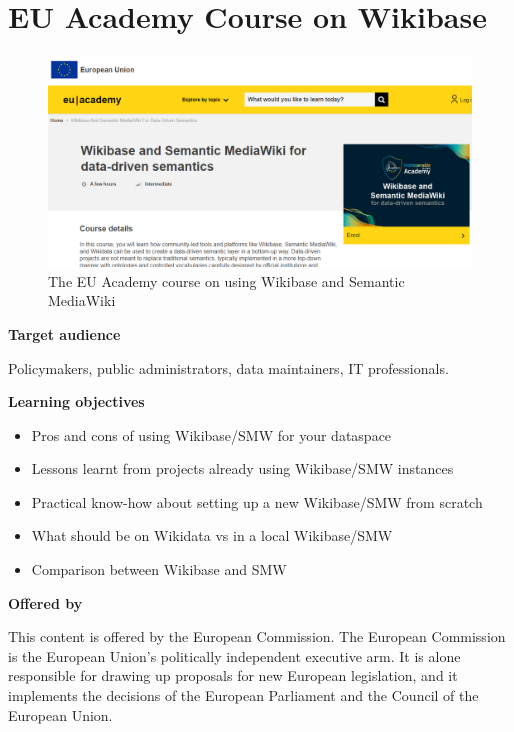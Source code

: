 \documentclass[
  letterpaper,
  DIV=11,
  numbers=noendperiod]{scrreprt}
\begin{document}
\section{EU Academy Course on
Wikibase}\label{eu-academy-course-on-wikibase}

\begin{figure}[H]

{\centering \includegraphics{png/wikibase/EU-academy-course/eu_academy_course.png}

}

\caption{The EU Academy course on using Wikibase and Semantic MediaWiki}

\end{figure}%

\textbf{Target audience}

Policymakers, public administrators, data maintainers, IT professionals.

\textbf{Learning objectives}

\begin{itemize}
\item
  Pros and cons of using Wikibase/SMW for your dataspace
\item
  Lessons learnt from projects already using Wikibase/SMW instances
\item
  Practical know-how about setting up a new Wikibase/SMW from scratch
\item
  What should be on Wikidata vs in a local Wikibase/SMW
\item
  Comparison between Wikibase and SMW
\end{itemize}

\textbf{Offered by}

This content is offered by the European Commission. The European
Commission is the European Union's politically independent executive
arm. It is alone responsible for drawing up proposals for new European
legislation, and it implements the decisions of the European Parliament
and the Council of the European Union.
\end{document}

